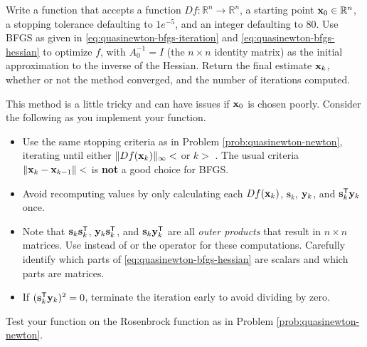 \begin{problem} %
Write a function that accepts a function $Df:\mathbb{R}^n\rightarrow\mathbb{R}^n$, a starting point $\mathbf{x}_0 \in \mathbb{R}^n$, a stopping tolerance  defaulting to $1e^{-5}$, and an integer  defaulting to $80$.
Use BFGS as given in \eqref{eq:quasinewton-bfgs-iteration} and \eqref{eq:quasinewton-bfgs-hessian} to optimize $f$, with $A_0^{-1} = I$ (the $n\times n$ identity matrix) as the initial approximation to the inverse of the Hessian.
Return the final estimate $\mathbf{x}_k$, whether or not the method converged, and the number of iterations computed.

This method is a little tricky and can have issues if $\mathbf{x}_0$ is chosen poorly.
Consider the following as you implement your function.
\begin{itemize}
    \item Use the same stopping criteria as in Problem \ref{prob:quasinewton-newton}, iterating until either $\|Df(\mathbf{x}_{k})\|_\infty <$  or $k >$ .
    The usual criteria $\|\mathbf{x}_{k} - \mathbf{x}_{k-1}\| <$  is \textbf{not} a good choice for BFGS.
    \item Avoid recomputing values by only calculating each $Df(\mathbf{x}_k)$, $\mathbf{s}_k$, $\mathbf{y}_k$, and $\mathbf{s}_k^{\mathsf T}\mathbf{y}_k$ once.
    \item Note that $\mathbf{s}_k\mathbf{s}_k^{\mathsf T}$, $\mathbf{y}_k\mathbf{s}_k^{\mathsf T}$, and $\mathbf{s}_k\mathbf{y}_k^{\mathsf T}$ are all \emph{outer products} that result in $n\times n$ matrices.
    Use  instead of  or the  operator for these computations.
    Carefully identify which parts of \eqref{eq:quasinewton-bfgs-hessian} are scalars and which parts are matrices.
    \item If $(\mathbf{s}_k^{\mathsf T}\mathbf{y}_k)^2 = 0$, terminate the iteration early to avoid dividing by zero.
\end{itemize}
Test your function on the Rosenbrock function as in Problem \ref{prob:quasinewton-newton}.

\label{prob:quasinewton-bfgs}
\end{problem}

